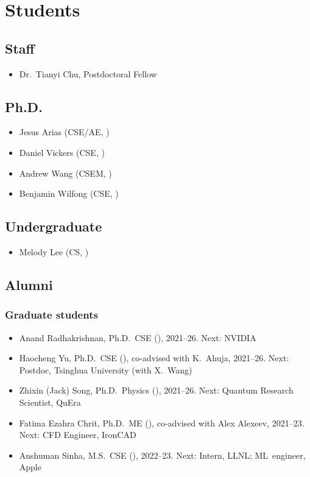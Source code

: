\section{Students}

\subsection{Staff}

\begin{itemize}
    \item Dr.\ Tianyi Chu, Postdoctoral Fellow
\end{itemize}

\subsection{Ph.D.}

\begin{itemize}
    \item Jesus Arias (CSE/AE, \GT)
    \item Daniel Vickers (CSE, \GT)
    \item Andrew Wang (CSEM, \UT)
    \item Benjamin Wilfong (CSE, \GT)
\end{itemize}

\subsection{Undergraduate}

\begin{itemize}
    \item Melody Lee (CS, \GT)
\end{itemize}

\subsection{Alumni}

\subsubsection{Graduate students}

\begin{itemize}
    \item Anand Radhakrishnan, Ph.D.\ CSE (\GT), 2021--26. Next: NVIDIA
    \item Haocheng Yu, Ph.D.\ CSE (\GT), co-advised with K.\ Ahuja, 2021--26. Next: Postdoc, Tsinghua University (with X.~Wang)
    \item Zhixin (Jack) Song, Ph.D.\ Physics (\GT), 2021--26. Next: Quantum Research Scientist, QuEra
    \item Fatima Ezahra Chrit, Ph.D.\ ME (\GT), co-advised with Alex Alexeev, 2021--23. Next: CFD Engineer, IronCAD
    \item Anshuman Sinha, M.S.\ CSE (\GT), 2022--23. Next: Intern, LLNL; ML~engineer, Apple
\end{itemize}

